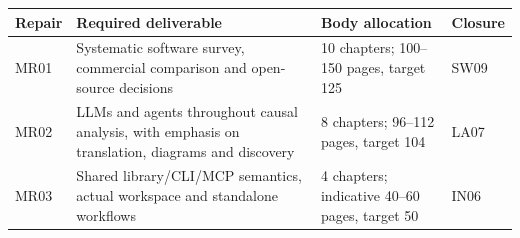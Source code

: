 \documentclass[
  11pt,
  a4paper,
]{article}
\begin{document}
\begin{longtable}[]{@{}llll@{}}
\toprule
\begin{minipage}[b]{0.22\columnwidth}\raggedright
Repair\strut
\end{minipage} & \begin{minipage}[b]{0.22\columnwidth}\raggedright
Required deliverable\strut
\end{minipage} & \begin{minipage}[b]{0.22\columnwidth}\raggedright
Body allocation\strut
\end{minipage} & \begin{minipage}[b]{0.22\columnwidth}\raggedright
Closure\strut
\end{minipage}\tabularnewline
\midrule
\endhead
\begin{minipage}[t]{0.22\columnwidth}\raggedright
MR01\strut
\end{minipage} & \begin{minipage}[t]{0.22\columnwidth}\raggedright
Systematic software survey, commercial comparison and open-source
decisions\strut
\end{minipage} & \begin{minipage}[t]{0.22\columnwidth}\raggedright
10 chapters; 100--150 pages, target 125\strut
\end{minipage} & \begin{minipage}[t]{0.22\columnwidth}\raggedright
SW09\strut
\end{minipage}\tabularnewline
\begin{minipage}[t]{0.22\columnwidth}\raggedright
MR02\strut
\end{minipage} & \begin{minipage}[t]{0.22\columnwidth}\raggedright
LLMs and agents throughout causal analysis, with emphasis on
translation, diagrams and discovery\strut
\end{minipage} & \begin{minipage}[t]{0.22\columnwidth}\raggedright
8 chapters; 96--112 pages, target 104\strut
\end{minipage} & \begin{minipage}[t]{0.22\columnwidth}\raggedright
LA07\strut
\end{minipage}\tabularnewline
\begin{minipage}[t]{0.22\columnwidth}\raggedright
MR03\strut
\end{minipage} & \begin{minipage}[t]{0.22\columnwidth}\raggedright
Shared library/CLI/MCP semantics, actual workspace and standalone
workflows\strut
\end{minipage} & \begin{minipage}[t]{0.22\columnwidth}\raggedright
4 chapters; indicative 40--60 pages, target 50\strut
\end{minipage} & \begin{minipage}[t]{0.22\columnwidth}\raggedright
IN06\strut
\end{minipage}\tabularnewline
\bottomrule
\end{longtable}
\end{document}
